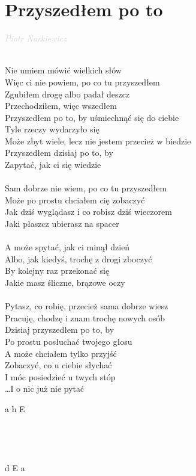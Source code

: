 \documentclass[a5paper, 10pt]{book}
\begin{document}
\section{Przyszedłem po to}\textcolor{lightgray}{\textit{Piotr Narkiewicz}}\\~\\
\begin{minipage}[t]{0.8\textwidth}
  Nie umiem mówić wielkich słów\\
  Więc ci nie powiem, po co tu przyszedłem\\
  Zgubiłem drogę albo padał deszcz\\
  Przechodziłem, więc wszedłem\\

  \hspace*{5mm}Przyszedłem po to, by uśmiechnąć się do ciebie\\

  Tyle rzeczy wydarzyło się\\
  Może zbyt wiele, lecz nie jestem przecież w biedzie\\
  Przyszedłem dzisiaj po to, by\\
  Zapytać, jak ci się wiedzie\\
  \\
  Sam dobrze nie wiem, po co tu przyszedłem\\
  Może po prostu chciałem cię zobaczyć\\
  Jak dziś wyglądasz i co robisz dziś wieczorem\\
  Jaki płaszcz ubierasz na spacer\\
  \\
  A może spytać, jak ci minął dzień\\
  Albo, jak kiedyś, trochę z drogi zboczyć\\
  By kolejny raz przekonać się\\
  Jakie masz śliczne, brązowe oczy\\
  \\
  Pytasz, co robię, przecież sama dobrze wiesz\\
  Pracuję, chodzę i znam trochę nowych osób\\
  Dzisiaj przyszedłem po to, by\\
  Po prostu posłuchać twojego głosu\\

  A może chciałem tylko przyjść\\
  Zobaczyć, co u ciebie słychać\\
  I móc posiedzieć u twych stóp\\
  \hspace*{1.4cm}\ldots I o nic już nie pytać\\
\end{minipage}
\begin{minipage}[t]{0.2\textwidth}
  a h E\\~\\~\\~\\~\\
  d E a\\

\end{minipage}
\end{document}

